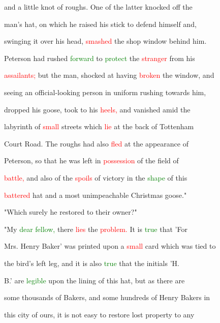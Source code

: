  and a little knot of roughs. One of the latter knocked off the

 man's hat, on which he raised his stick to \textcolor{BurntOrange}{defend} himself and,

 swinging it over his head, \textcolor{red}{smashed} the shop window behind him.

 Peterson had rushed \textcolor{green}{forward} to \textcolor{green}{protect} the \textcolor{red}{stranger} from his

 \textcolor{red}{assailants;} but the man, \textcolor{BurntOrange}{shocked} at having \textcolor{red}{broken} the window, and

 seeing an official-looking person in uniform rushing towards him,

 dropped his goose, took to his \textcolor{red}{heels,} and \textcolor{BurntOrange}{vanished} amid the

 \textcolor{BurntOrange}{labyrinth} of \textcolor{red}{small} streets which \textcolor{red}{lie} at the back of Tottenham

 \textcolor{BurntOrange}{Court} Road. The roughs had also \textcolor{red}{fled} at the appearance of

 Peterson, so that he was left in \textcolor{red}{possession} of the field of

 \textcolor{red}{battle,} and also of the \textcolor{red}{spoils} of \textcolor{BurntOrange}{victory} in the \textcolor{green}{shape} of this

 \textcolor{red}{battered} hat and a most unimpeachable Christmas goose."



 "Which surely he restored to their owner?"



 "My \textcolor{green}{dear} \textcolor{green}{fellow,} there \textcolor{red}{lies} the \textcolor{red}{problem.} It is \textcolor{green}{true} that 'For

 Mrs. Henry Baker' was printed upon a \textcolor{red}{small} card which was tied to

 the bird's left leg, and it is also \textcolor{green}{true} that the initials 'H.

 B.' are \textcolor{green}{legible} upon the lining of this hat, but as there are

 some thousands of Bakers, and some hundreds of Henry Bakers in

 this city of ours, it is not easy to restore \textcolor{BurntOrange}{lost} property to any


